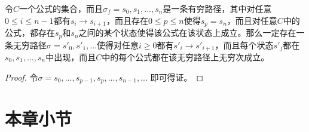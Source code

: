 \begin{proposition}\label{prop:fair_fi}
	令$C$一个\CTLP{}公式的集合，而且$\sigma_f = s_0,s_1,...,s_n$是一条有穷路径，其中对任意$0\le i\le n-1$都有$s_i\rightarrow s_{i+1}$，而且存在$0\le p\le n$使得$s_p = s_n$，而且对任意$C$中的公式，都存在$s_p$和$s_n$之间的某个状态使得该公式在该状态上成立。那么一定存在一条无穷路径$\sigma = s'_0, s'_1,...$使得对任意$i\ge 0$都有$s'_i \rightarrow s'_{i+1}$，而且每个状态$s'_j$都在$s_0,s_1,...,s_n$中出现，而且$C$中的每个公式都在该无穷路径上无穷次成立。
\end{proposition}
\begin{proof}
	令$\sigma = s_0,...,s_{p-1},s_p,...,s_{n-1},...$ 
	即可得证。
\end{proof}

\section{本章小节}


